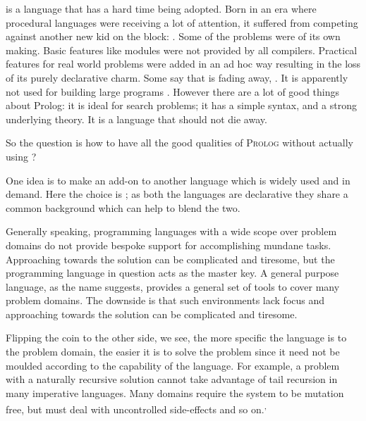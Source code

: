 \documentclass[thesis-solanki.tex]{subfiles}
\begin{document}
 is a language that has a hard time being adopted.
Born in an era where procedural languages were receiving a lot of attention, it suffered from competing against another
new kid on the block: .
Some of the problems were of its own making.
Basic features like modules were not provided by all compilers.
Practical features for real world problems were added in an ad hoc way resulting in the loss of its purely declarative
charm.
Some say that  is fading away, \cite{website:prolog-steam,website:prolog-death,website:prolog-killer}.
It is apparently not used for building large programs \cite{wikiprolog,somogyi1995logic,website:prolog1000db}.
However there are a lot of good things about Prolog: it is ideal for search problems; it has a simple syntax, and a
strong underlying theory.
It is a language that should not die away.

So the question is how to have all the good qualities of \textsc{Prolog} without actually using ?

One idea is to make  an add-on to another language which is widely used and in demand.
Here the choice is ; as both the languages are declarative they share a common background which can
help to blend the two.

Generally speaking, programming languages with a wide scope over problem domains do not provide bespoke support for
accomplishing  mundane tasks.
Approaching towards the solution can be complicated and tiresome, but the programming language in question acts as the
master key.%
A general purpose language, as the name suggests{\large ,} provides a general set of tools to cover many
problem domains.
The downside is that such environments lack focus and approaching towards the solution can be complicated and
tiresome.


Flipping the coin to the other side, we see, the more specific the language is to the problem domain, the easier it
is to solve the problem since it need not be moulded according to the capability  of the
language.
For example, a problem with a naturally recursive solution cannot take advantage of tail recursion in many
imperative languages.
Many domains require the system to be mutation free, but must deal with uncontrolled side-effects and so
on.\textsuperscript{,}%
\end{document}
